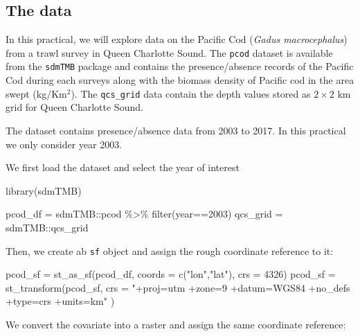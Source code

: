 \documentclass[
  letterpaper,
  DIV=11,
  numbers=noendperiod]{scrartcl}
\newenvironment{Shaded}{\begin{snugshade}}{\end{snugshade}}
\newcommand{\AttributeTok}[1]{\textcolor[rgb]{0.40,0.45,0.13}{#1}}
\newcommand{\DecValTok}[1]{\textcolor[rgb]{0.68,0.00,0.00}{#1}}
\newcommand{\FunctionTok}[1]{\textcolor[rgb]{0.28,0.35,0.67}{#1}}
\newcommand{\NormalTok}[1]{\textcolor[rgb]{0.00,0.23,0.31}{#1}}
\newcommand{\OtherTok}[1]{\textcolor[rgb]{0.00,0.23,0.31}{#1}}
\newcommand{\SpecialCharTok}[1]{\textcolor[rgb]{0.37,0.37,0.37}{#1}}
\newcommand{\StringTok}[1]{\textcolor[rgb]{0.13,0.47,0.30}{#1}}
\begin{document}
\subsection{The data}\label{the-data-1}

In this practical, we will explore data on the Pacific Cod (\emph{Gadus
macrocephalus}) from a trawl survey in Queen Charlotte Sound. The
\texttt{pcod} dataset is available from the \texttt{sdmTMB} package and
contains the presence/absence records of the Pacific Cod during each
surveys along with the biomass density of Pacific cod in the area swept
(kg/Km\(^2\)). The \texttt{qcs\_grid} data contain the depth values
stored as \(2\times 2\) km grid for Queen Charlotte Sound.

The dataset contains presence/absence data from 2003 to 2017. In this
practical we only consider year 2003.

We first load the dataset and select the year of interest

\begin{Shaded}
\begin{Highlighting}[]
\FunctionTok{library}\NormalTok{(sdmTMB)}

\NormalTok{pcod\_df }\OtherTok{=}\NormalTok{ sdmTMB}\SpecialCharTok{::}\NormalTok{pcod }\SpecialCharTok{\%\textgreater{}\%} \FunctionTok{filter}\NormalTok{(year}\SpecialCharTok{==}\DecValTok{2003}\NormalTok{)}
\NormalTok{qcs\_grid }\OtherTok{=}\NormalTok{ sdmTMB}\SpecialCharTok{::}\NormalTok{qcs\_grid}
\end{Highlighting}
\end{Shaded}

Then, we create ab \texttt{sf} object and assign the rough coordinate
reference to it:

\begin{Shaded}
\begin{Highlighting}[]
\NormalTok{pcod\_sf }\OtherTok{=}   \FunctionTok{st\_as\_sf}\NormalTok{(pcod\_df, }\AttributeTok{coords =} \FunctionTok{c}\NormalTok{(}\StringTok{"lon"}\NormalTok{,}\StringTok{"lat"}\NormalTok{), }\AttributeTok{crs =} \DecValTok{4326}\NormalTok{)}
\NormalTok{pcod\_sf }\OtherTok{=} \FunctionTok{st\_transform}\NormalTok{(pcod\_sf,}
\AttributeTok{crs =} \StringTok{"+proj=utm +zone=9 +datum=WGS84 +no\_defs +type=crs +units=km"}\NormalTok{ )}
\end{Highlighting}
\end{Shaded}

We convert the covariate into a raster and assign the same coordinate
reference:
\end{document}
